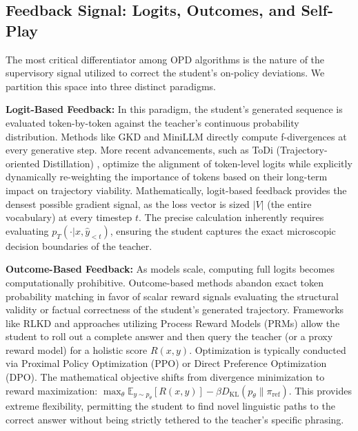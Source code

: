 \documentclass{article} %
\newcommand{\KL}{D_{\mathrm{KL}}}
\newcommand{\ptheta}{p_\theta}
\newcommand{\pteacher}{p_T}
\begin{document}
\subsection{Feedback Signal: Logits, Outcomes, and Self-Play}
\label{subsec:tax_feedback}

The most critical differentiator among OPD algorithms is the nature of the supervisory signal utilized to correct the student's on-policy deviations. We partition this space into three distinct paradigms.

\textbf{Logit-Based Feedback:} In this paradigm, the student's generated sequence is evaluated token-by-token against the teacher's continuous probability distribution. Methods like GKD \citep{2306.13649} and MiniLLM \citep{2306.08543} directly compute f-divergences at every generative step. More recent advancements, such as ToDi (Trajectory-oriented Distillation) \citep{2505.16297}, optimize the alignment of token-level logits while explicitly dynamically re-weighting the importance of tokens based on their long-term impact on trajectory viability. Mathematically, logit-based feedback provides the densest possible gradient signal, as the loss vector is sized $|V|$ (the entire vocabulary) at every timestep $t$. The precise calculation inherently requires evaluating $\pteacher(\cdot|x, \hat{y}_{<t})$, ensuring the student captures the exact microscopic decision boundaries of the teacher.

\textbf{Outcome-Based Feedback:} As models scale, computing full logits becomes computationally prohibitive. Outcome-based methods abandon exact token probability matching in favor of scalar reward signals evaluating the structural validity or factual correctness of the student's generated trajectory. Frameworks like RLKD \citep{2505.16142} and approaches utilizing Process Reward Models (PRMs) \citep{2305.20050} allow the student to roll out a complete answer and then query the teacher (or a proxy reward model) for a holistic score $R(x, y)$. Optimization is typically conducted via Proximal Policy Optimization (PPO) or Direct Preference Optimization (DPO). The mathematical objective shifts from divergence minimization to reward maximization: $\max_\theta \mathbb{E}_{y \sim \ptheta} [R(x, y)] - \beta \KL(\ptheta \parallel \pi_{\mathrm{ref}})$. This provides extreme flexibility, permitting the student to find novel linguistic paths to the correct answer without being strictly tethered to the teacher's specific phrasing.
\end{document}
